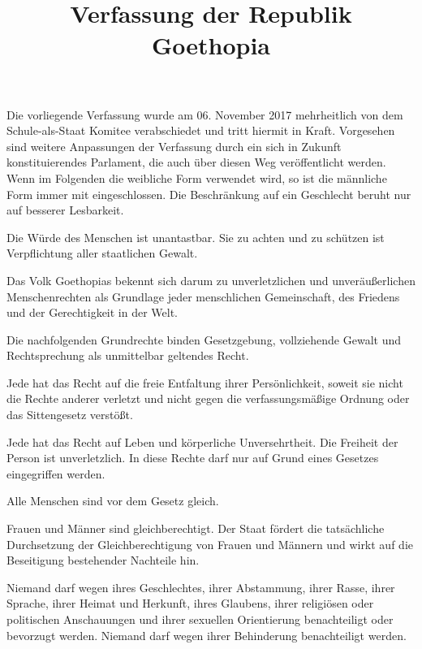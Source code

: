\documentclass{sasbase}
\begin{document}
\title{Verfassung der Republik Goethopia}

\setcounter{secnumdepth}{5}

\mytitle

\parensstyle


Die vorliegende Verfassung wurde am 06. November 2017 mehrheitlich von dem Schule-als-Staat Komitee verabschiedet und tritt hiermit in Kraft. Vorgesehen sind weitere Anpassungen der Verfassung durch ein sich in Zukunft konstituierendes Parlament, die auch \"{u}ber diesen Weg ver\"{o}ffentlicht werden.\\
\indent Wenn im Folgenden die weibliche Form verwendet wird, so ist die männliche Form immer mit eingeschlossen. Die Beschränkung auf ein Geschlecht beruht nur auf besserer Lesbarkeit.


\begin{article}
	\item Die Würde des Menschen ist unantastbar. Sie zu achten und zu schützen ist Verpflichtung aller staatlichen Gewalt.
 	\item Das Volk Goethopias bekennt sich darum zu unverletzlichen und unveräußerlichen Menschenrechten als Grundlage jeder menschlichen Gemeinschaft, des Friedens und der Gerechtigkeit in der Welt.
	\item Die nachfolgenden Grundrechte binden Gesetzgebung, vollziehende Gewalt und Rechtsprechung als unmittelbar geltendes Recht.
\end{article}

\begin{article}
	\item Jede hat das Recht auf die freie Entfaltung ihrer Persönlichkeit, soweit sie nicht die Rechte anderer verletzt und nicht gegen die verfassungsmäßige Ordnung oder das Sittengesetz verstößt.	
	\item Jede hat das Recht auf Leben und körperliche Unversehrtheit. Die Freiheit der Person ist unverletzlich. In diese Rechte darf nur auf Grund eines Gesetzes eingegriffen werden.
\end{article}

\begin{article}
	\item Alle Menschen sind vor dem Gesetz gleich.
	\item Frauen und Männer sind gleichberechtigt. Der Staat fördert die tatsächliche Durchsetzung der Gleichberechtigung von Frauen und Männern und wirkt auf die Beseitigung bestehender Nachteile hin.
	\item Niemand darf wegen ihres Geschlechtes, ihrer Abstammung, ihrer Rasse, ihrer Sprache, ihrer Heimat und Herkunft, ihres Glaubens, ihrer religiösen oder politischen Anschauungen und ihrer sexuellen Orientierung benachteiligt oder bevorzugt werden. Niemand darf wegen ihrer Behinderung benachteiligt werden.
\end{article}
\end{document}
